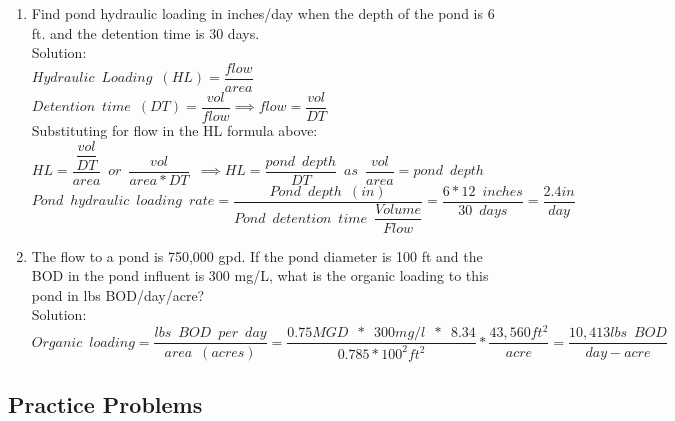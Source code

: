 \documentclass{article}
\begin{document}
\begin{enumerate}
\item Find pond hydraulic loading in inches/day when the depth of the pond is 6 ft. and the detention time is 30 days.\\
Solution:\\

$Hydraulic \enspace Loading \enspace (HL)=\dfrac{flow}{area}$\\
$Detention \enspace time \enspace (DT)=\dfrac{vol}{flow} \implies flow=\dfrac{vol}{DT} $\\
Substituting \enspace for \enspace flow \enspace in \enspace the HL \enspace formula above:\\
$HL=\dfrac{\dfrac{vol}{DT}}{area}\enspace or \enspace \dfrac{vol}{area*DT} \enspace \implies \boxed{HL=\dfrac{pond \enspace depth}{DT}} \enspace as \enspace \dfrac{vol}{area}=pond \enspace depth$\\

$Pond \enspace hydraulic \enspace loading \enspace rate=\dfrac{Pond \enspace depth \enspace (in)}{Pond \enspace detention  \enspace time \enspace \dfrac{Volume}{Flow}}=\dfrac{6*12 \enspace inches}{30 \enspace days}=\boxed{\dfrac{2.4in}{day}}$\\
\vspace{0.5cm}

\item The flow to a pond is 750,000 gpd. If the pond diameter is 100 ft and the BOD in the pond influent is 300 mg/L, what is the organic loading to this pond in lbs BOD/day/acre?
\\
Solution:\\
$Organic \enspace loading=\dfrac{lbs \enspace BOD \enspace per \enspace day}{area \enspace (acres)}=\dfrac{0.75MGD \enspace * \enspace 300mg/l \enspace * \enspace 8.34}{0.785*100^2ft^2}*\dfrac{43,560ft^2}{acre}=\boxed{\dfrac{10,413lbs \enspace BOD}{day-acre}}$










\end{enumerate}

\subsection{Practice Problems} 
\end{document}
